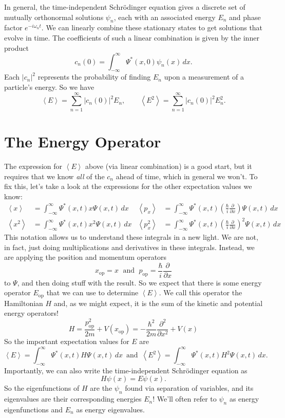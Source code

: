\documentclass[../p052main.tex]{subfiles}
\begin{document}
\vspace{-5pt}
\begin{summary}
    In general, the time-independent Schrödinger equation gives a discrete set of mutually orthonormal solutions $\psi_n$, each with an associated energy $E_n$ and phase factor $e^{-i \omega_n t}$.
    We can linearly combine these stationary states to get solutions that evolve in time.
    The coefficients of such a linear combination is given by the inner product
    \[ c_n(0) = \int_{-\infty}^{\infty} \Psi^*(x,0)\psi_n(x) \,dx. \]
    Each $|c_n|^2$ represents the probability of finding $E_n$ upon a measurement of a particle's energy.
    So we have
    \[ \left< E \right> = \sum_{n=1}^{\infty} |c_n(0)|^2 E_n, \qquad \left< E^2 \right> = \sum_{n=1}^{\infty} |c_n(0)|^2 E_n^2. \]
\end{summary}

\section{The Energy Operator}
The expression for $\left< E \right>$ above (via linear combination) is a good start, but it requires that we know \textit{all} of the $c_n$ ahead of time, which in general we won't.
To fix this, let's take a look at the expressions for the other expectation values we know:
\begin{align*}
    \left< x \right> &= \int_{-\infty}^{\infty} \Psi^*(x,t) x \Psi(x,t) \,dx & \left< p_x \right> &= \int_{-\infty}^{\infty} \Psi^*(x,t) \left( \frac{\hbar}{i} \frac{\partial}{\partial x} \right) \Psi(x,t) \,dx \\
    \left< x^2 \right> &= \int_{-\infty}^{\infty} \Psi^*(x,t) x^2 \Psi(x,t) \,dx & \left< p_x^2 \right> &= \int_{-\infty}^{\infty} \Psi^*(x,t) \left( \frac{\hbar}{i} \frac{\partial}{\partial x} \right)^2 \Psi(x,t) \,dx
\end{align*}
This notation allows us to understand these integrals in a new light.
We are not, in fact, just doing multiplications and derivatives in these integrals.
Instead, we are applying the position and momentum operators
\[ x_\textrm{op} = x \;\text{ and }\; p_\textrm{op} = \frac{\hbar}{i} \frac{\partial}{\partial x} \]
to $\Psi$, and then doing stuff with the result.
So we expect that there is some energy operator $E_\textrm{op}$ that we can use to determine $\left< E \right>$.
We call this operator the Hamiltonian $H$ and, as we might expect, it is the sum of the kinetic and potential energy operators!
\[ H = \frac{p_\textrm{op}^2}{2m} + V(x_\textrm{op}) = -\frac{\hbar^2}{2m}\frac{\partial^2}{\partial x^2} + V(x) \]
So the important expectation values for $E$ are
\[ \left< E \right> = \int_{-\infty}^{\infty} \Psi^*(x,t) H \Psi(x,t) \,dx \,\text{ and }\, \left< E^2 \right> = \int_{-\infty}^{\infty} \Psi^*(x,t) H^2 \Psi(x,t) \,dx. \]
Importantly, we can also write the time-independent Schrödinger equation as
\[ H \psi(x) = E \psi(x). \]
So the eigenfunctions of $H$ are the $\psi_n$ found via separation of variables, and its eigenvalues are their corresponding energies $E_n$!
We'll often refer to $\psi_n$ as energy eigenfunctions and $E_n$ as energy eigenvalues.
\end{document}
